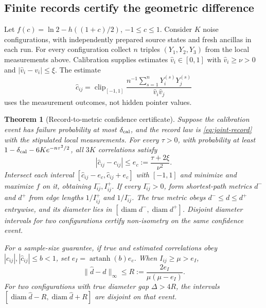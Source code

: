 \documentclass[12pt,a4paper]{article}
\newtheorem{theorem}{Theorem}[section]
\begin{document}
\subsection{Finite records certify the geometric difference}
\label{sec:record-certificate}

Let $f(c)=\ln2-h((1+c)/2)$, $-1\le c\le1$. Consider $K$ noise
configurations, with independently prepared source states and fresh
ancillas in each run. For every configuration collect $n$ triples
$(Y_1,Y_2,Y_3)$ from the local measurements above. Calibration supplies
estimates $\widehat v_i\in[0,1]$ with $\widehat v_i\ge\nu>0$ and
$|\widehat v_i-v_i|\le\xi$. The estimate
\[
\widehat c_{ij}
 =\operatorname{clip}_{[-1,1]}
   \frac{n^{-1}\sum_{s=1}^nY_i^{(s)}Y_j^{(s)}}
        {\widehat v_i\widehat v_j}
\]
uses the measurement outcomes, not hidden pointer values.

\begin{theorem}[Record-to-metric confidence certificate]
\label{thm:record-metric}
Suppose the calibration event has failure probability at most
$\delta_{\rm cal}$, and the record law is \eqref{eq:joint-record} with
the stipulated local measurements. For every $\tau>0$, with
probability at least
$1-\delta_{\rm cal}-6K e^{-n\tau^2/2}$, all $3K$ correlations satisfy
\begin{equation}
|\widehat c_{ij}-c_{ij}|
 \le e_c:=\frac{\tau+2\xi}{\nu^2}.
\label{eq:ec}
\end{equation}
Intersect each interval $[\widehat c_{ij}-e_c,\widehat c_{ij}+e_c]$
with $[-1,1]$ and minimize and maximize $f$ on it, obtaining
$I^-_{ij},I^+_{ij}$. If every $I^-_{ij}>0$, form shortest-path metrics
$d^-$ and $d^+$ from edge lengths $1/I^+_{ij}$ and $1/I^-_{ij}$.
The true metric obeys $d^-\le d\le d^+$ entrywise, and its diameter
lies in $[\operatorname{diam}d^-,\operatorname{diam}d^+]$.
Disjoint diameter intervals for two configurations certify
non-isometry on the same confidence event.

For a sample-size guarantee, if true and estimated correlations obey
$|c_{ij}|,|\widehat c_{ij}|\le b<1$, set
$e_I=\operatorname{artanh}(b)e_c$. When $I_{ij}\ge\mu>e_I$,
\begin{equation}
\|\widehat d-d\|_\infty
 \le R:=\frac{2e_I}{\mu(\mu-e_I)} .
\label{eq:diam-radius}
\end{equation}
For two configurations with true diameter gap $\Delta>4R$, the
intervals
$[\operatorname{diam}\widehat d-R,\operatorname{diam}\widehat d+R]$
are disjoint on that event.
\end{theorem}
\end{document}
